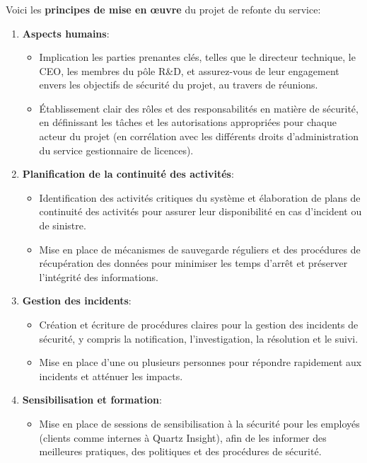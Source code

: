 \documentclass[a4paper, 11pt]{report}
\begin{document}
  \subsubsection{}
  Voici les \textbf{principes de mise en œuvre} du projet de refonte du service:
  \begin{enumerate}
    \item \textbf{Aspects humains}:
      \begin{itemize}
        \item Implication les parties prenantes clés, telles que le directeur technique, le CEO, les membres du pôle R&D, et assurez-vous de leur engagement envers les objectifs de sécurité du projet, au travers de réunions.
        \item Établissement clair des rôles et des responsabilités en matière de sécurité, en définissant les tâches et les autorisations appropriées pour chaque acteur du projet (en corrélation avec les différents droits d'administration du service gestionnaire de licences).
      \end{itemize}
    \item \textbf{Planification de la continuité des activités}:
      \begin{itemize}
        \item Identification des activités critiques du système et élaboration de plans de continuité des activités pour assurer leur disponibilité en cas d'incident ou de sinistre.
        \item Mise en place de mécanismes de sauvegarde réguliers et des procédures de récupération des données pour minimiser les temps d'arrêt et préserver l'intégrité des informations.
      \end{itemize}
    \item \textbf{Gestion des incidents}:
      \begin{itemize}
        \item Création et écriture de procédures claires pour la gestion des incidents de sécurité, y compris la notification, l'investigation, la résolution et le suivi.
        \item Mise en place d'une ou plusieurs personnes pour répondre rapidement aux incidents et atténuer les impacts.
      \end{itemize}
    \item \textbf{Sensibilisation et formation}:
      \begin{itemize}
        \item Mise en place de sessions de sensibilisation à la sécurité pour les employés (clients comme internes à Quartz Insight), afin de les informer des meilleures pratiques, des politiques et des procédures de sécurité. \

\end{itemize}
\end{enumerate}
\end{document}
